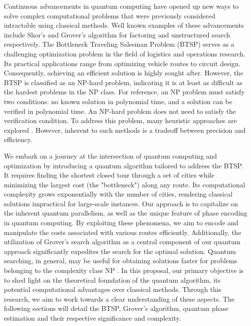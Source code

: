 \documentclass[twocolumn,showpacs,preprintnumbers,amsmath,amssymb]{revtex4}
\begin{document}
		
		Continuous advancements in quantum computing have opened up new ways to solve complex computational problems that were previously considered intractable using classical methods. Well known examples of these advancements include Shor's \cite{Shor} and Grover's \cite{grover1996fast} algorithm for factoring and unstructured search respectively. The Bottleneck Traveling Salesman Problem (BTSP) serves as a challenging optimization problem in the field of logistics and operations research. Its practical applications range from optimizing vehicle routes to circuit design. Consequently, achieving an efficient solution is highly sought after. However, the BTSP is classified as an NP-hard problem, indicating it is at least as difficult as the hardest problems in the NP class. For reference, an NP problem must satisfy two conditions: no known solution in polynomial time, and a solution can be verified in polynomial time. An NP-hard problem does not need to satisfy the verification condition. To address this problem, many heuristic approaches are explored \cite{heuristicthesis}\cite{heuristic}. However, inherent to such methods is a tradeoff between precision and efficiency.
		
		We embark on a journey at the intersection of quantum computing and optimization by introducing a quantum algorithm tailored to address the BTSP. It requires finding the shortest closed tour through a set of cities while minimizing the largest cost (the "bottleneck") along any route. Its computational complexity grows exponentially with the number of cities, rendering classical solutions impractical for large-scale instances. Our approach is to capitalize on the inherent quantum parallelism, as well as the unique feature of phase encoding in quantum computing. By exploiting these phenomena, we aim to encode and manipulate the costs associated with various routes efficiently. Additionally, the utilization of Grover's search algorithm as a central component of our quantum approach significantly expedites the search for the optimal solution.  Quantum searching, in general, may be useful for obtaining solutions faster for problems belonging to the complexity class NP \cite{nielsen00}. In this proposal, our primary objective is to shed light on the theoretical foundation of the quantum algorithm, its potential computational advantages over classical methods. Through this research, we aim to work towards a clear understanding of these aspects. The following sections will detail the BTSP, Grover's algorithm, quantum phase estimation and their respective significance and complexity. 
		
\end{document}
